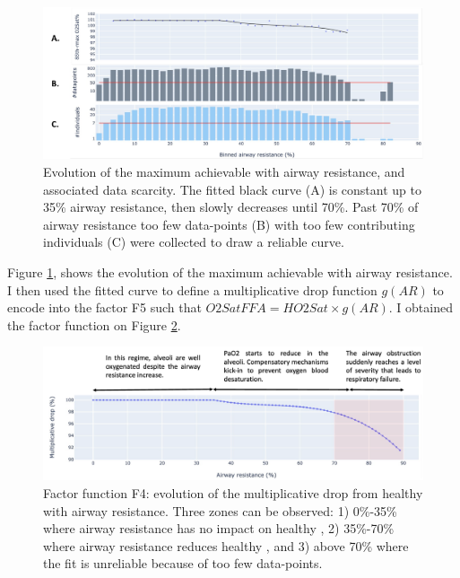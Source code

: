 \begin{figure}[!h]
    \centering
    \includegraphics[width=140mm]{Chapter1/Figs/f1_fit.png}
    \caption{Evolution of the maximum achievable \OXSatPrct with airway resistance, and associated data scarcity. The fitted black curve (A) is constant up to 35\% airway resistance, then slowly decreases until 70\%. Past 70\% of airway resistance too few data-points (B) with too few contributing individuals (C) were collected to draw a reliable curve.}
    \label{fig:f1_fit}
\end{figure}

Figure \ref{fig:f1_fit}, shows the evolution of the maximum achievable \OXSatPrct with airway resistance. I then used the fitted curve to define a multiplicative drop function $g(AR)$ to encode into the factor F5 such that $O2SatFFA = HO2Sat \times g(AR)$. I obtained the factor function on Figure  \ref{fig:f1_func}.

\begin{figure}
    \centering
    \includegraphics[width=140mm]{Chapter1/Figs/f1_func.png}
    \caption{Factor function F4: evolution of the multiplicative drop from healthy \OXSat with airway resistance. Three zones can be observed: 1) 0\%-35\% where airway resistance has no impact on healthy \OXSat, 2) 35\%-70\% where airway resistance reduces healthy \OXSat, and 3) above 70\% where the fit is unreliable because of too few data-points.}
    \label{fig:f1_func}
\end{figure}

